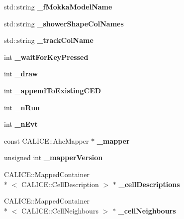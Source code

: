\begin{DoxyCompactItemize}
\item 
std\-::string {\bfseries \-\_\-f\-Mokka\-Model\-Name}\label{classCALICE_1_1EventDisplayProcessor_aa5b896435eb4c373970396fac01e050c}

\item 
std\-::string {\bfseries \-\_\-shower\-Shape\-Col\-Names}\label{classCALICE_1_1EventDisplayProcessor_a4946742dffb613191debad2305a9d4be}

\item 
std\-::string {\bfseries \-\_\-track\-Col\-Name}\label{classCALICE_1_1EventDisplayProcessor_a41d1d71e48d0ff487039549ed37cfe3e}

\item 
int {\bfseries \-\_\-wait\-For\-Key\-Pressed}\label{classCALICE_1_1EventDisplayProcessor_a32366f61a3fe9a3903ecf839a64a6689}

\item 
int {\bfseries \-\_\-draw}\label{classCALICE_1_1EventDisplayProcessor_a825f3f4c242a9762e79259e885f1adb2}

\item 
int {\bfseries \-\_\-append\-To\-Existing\-C\-E\-D}\label{classCALICE_1_1EventDisplayProcessor_a687eaf39c649eee27c749b448cdaf986}

\item 
int {\bfseries \-\_\-n\-Run}\label{classCALICE_1_1EventDisplayProcessor_ae6c8eb83553b91997dbacec716e0fd4c}

\item 
int {\bfseries \-\_\-n\-Evt}\label{classCALICE_1_1EventDisplayProcessor_ac73308944a57f40de0ffa64b113cbecc}

\item 
const C\-A\-L\-I\-C\-E\-::\-Ahc\-Mapper $\ast$ {\bfseries \-\_\-mapper}\label{classCALICE_1_1EventDisplayProcessor_a2b26430df1aec866f7971e2627da8860}

\item 
unsigned int {\bfseries \-\_\-mapper\-Version}\label{classCALICE_1_1EventDisplayProcessor_a42aea5d31a52a9da2953eeb1e67862b7}

\item 
C\-A\-L\-I\-C\-E\-::\-Mapped\-Container\\*
$<$ C\-A\-L\-I\-C\-E\-::\-Cell\-Description $>$ $\ast$ {\bfseries \-\_\-cell\-Descriptions}\label{classCALICE_1_1EventDisplayProcessor_a94ee4ec40eb5d377d15bc8239e659bb4}

\item 
C\-A\-L\-I\-C\-E\-::\-Mapped\-Container\\*
$<$ C\-A\-L\-I\-C\-E\-::\-Cell\-Neighbours $>$ $\ast$ {\bfseries \-\_\-cell\-Neighbours}\label{classCALICE_1_1EventDisplayProcessor_a12ee00ddafb412fe4f5fffcc9c049e80}


\end{DoxyCompactItemize}
